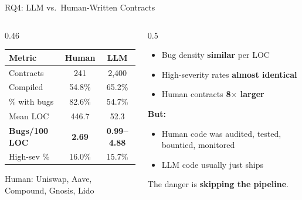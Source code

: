 \documentclass[aspectratio=169]{beamer}
\begin{document}
\begin{frame}{RQ4: LLM vs.\ Human-Written Contracts}
\begin{columns}
\begin{column}{0.46\textwidth}
\begin{center}
\small
\begin{tabular}{@{}lcc@{}}
\toprule
\textbf{Metric} & \textbf{Human} & \textbf{LLM} \\
\midrule
Contracts & 241 & 2,400 \\
Compiled & 54.8\% & 65.2\% \\
\% with bugs & 82.6\% & 54.7\% \\
Mean LOC & 446.7 & 52.3 \\
\textbf{Bugs/100 LOC} & \textbf{2.69} & \textbf{0.99--4.88} \\
High-sev \% & 16.0\% & 15.7\% \\
\bottomrule
\end{tabular}
\end{center}
\vspace{0.2cm}
\scriptsize Human: Uniswap, Aave, Compound, Gnosis, Lido
\end{column}
\begin{column}{0.5\textwidth}
\begin{itemize}\small
    \item Bug density \textbf{similar} per LOC
    \item High-severity rates \textbf{almost identical}
    \item Human contracts \textbf{8$\times$ larger}
\end{itemize}

\vspace{0.3cm}
\textbf{But:}
\begin{itemize}\small
    \item Human code was audited, tested, bountied, monitored
    \item LLM code usually just ships
\end{itemize}

\vspace{0.2cm}
\begin{block}{}
\centering The danger is \textbf{skipping the pipeline}.
\end{block}
\end{column}
\end{columns}
\end{frame}
\end{document}
